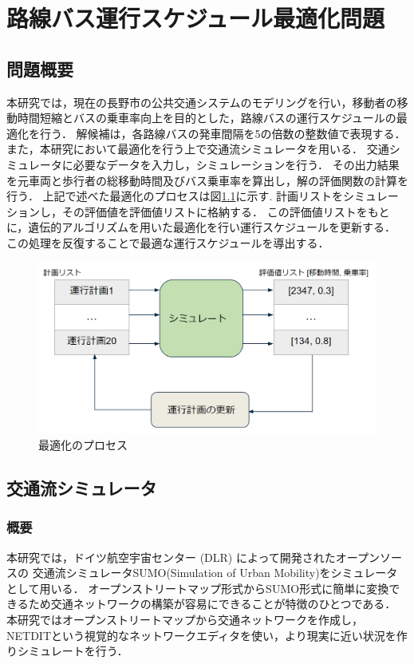 \documentclass[main]{subfiles}
\begin{document}
    \chapter{路線バス運行スケジュール最適化問題}
    \section{問題概要}
    本研究では，現在の長野市の公共交通システムのモデリングを行い，移動者の移動時間短縮とバスの乗車率向上を目的とした，路線バスの運行スケジュールの最適化を行う．
    解候補は，各路線バスの発車間隔を5の倍数の整数値で表現する．また，本研究において最適化を行う上で交通流シミュレータを用いる．
    交通シミュレータに必要なデータを入力し，シミュレーションを行う．
    その出力結果を元車両と歩行者の総移動時間及びバス乗車率を算出し，解の評価関数の計算を行う．
    上記で述べた最適化のプロセスは図\ref{algo}に示す.
    計画リストをシミュレーションし，その評価値を評価値リストに格納する．
    この評価値リストをもとに，遺伝的アルゴリズムを用いた最適化を行い運行スケジュールを更新する．
    この処理を反復することで最適な運行スケジュールを導出する．
    \begin{figure}
        \centering
        \includegraphics[width=\linewidth]{figures/algo.png}
        \caption{最適化のプロセス}
        \label{algo}
    \end{figure}

    \section{交通流シミュレータ}
        \subsection{概要}
        本研究では，ドイツ航空宇宙センター (DLR) によって開発されたオープンソースの
        交通流シミュレータSUMO(Simulation of Urban Mobility)\cite{sumo}をシミュレータとして用いる．
        オープンストリートマップ形式からSUMO形式に簡単に変換できるため交通ネットワークの構築が容易にできることが特徴のひとつである．
        本研究ではオープンストリートマップから交通ネットワークを作成し，
        NETDITという視覚的なネットワークエディタを使い，より現実に近い状況を作りシミュレートを行う．
\end{document}

